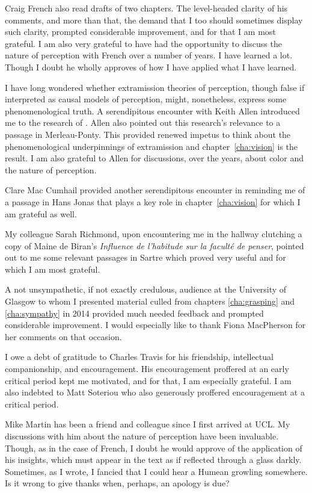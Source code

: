 Craig French also read drafts of two chapters. The level-headed clarity of his comments, and more than that, the demand that I too should sometimes display such clarity, prompted considerable improvement, and for that I am most grateful. I am also very grateful to have had the opportunity to discuss the nature of perception with French over a number of years. I have learned a lot. Though I doubt he wholly approves of how I have applied what I have learned.

I have long wondered whether extramission theories of perception, though false if interpreted as causal models of perception, might, nonetheless, express some phenomenological truth. A serendipitous encounter with Keith Allen introduced me to the research of \citet{Winer:1996as}. Allen also pointed out this research's relevance to a passage in Merleau-Ponty. This provided renewed impetus to think about the phenomenological underpinnings of extramission and chapter~\ref{cha:vision} is the result. I am also grateful to Allen for discussions, over the years, about color and the nature of perception.

Clare Mac Cumhail provided another serendipitous encounter in reminding me of a passage in Hans Jonas that plays a key role in chapter~\ref{cha:vision} for which I am grateful as well.

My colleague Sarah Richmond, upon encountering me in the hallway clutching a copy of Maine de Biran's \emph{Influence de l'habitude sur la facult\'{e} de penser}, pointed out to me some relevant passages in Sartre which proved very useful and for which I am most grateful.

A not unsympathetic, if not exactly credulous, audience at the University of Glasgow to whom I presented material culled from chapters \ref{cha:grasping} and \ref{cha:sympathy} in 2014 provided much needed feedback and prompted considerable improvement. I would especially like to thank Fiona MacPherson for her comments on that occasion.

I owe a debt of gratitude to Charles Travis for his friendship, intellectual companionship, and encouragement. His encouragement proffered at an early critical period kept me motivated, and for that, I am especially grateful. I am also indebted to Matt Soteriou who also generously proffered encouragement at a critical period.

Mike Martin has been a friend and colleague since I first arrived at UCL. My discussions with him about the nature of perception have been invaluable. Though, as in the case of French, I doubt he would approve of the application of his insights, which must appear in the text as if reflected through a glass darkly. Sometimes, as I wrote, I fancied that I could hear a Humean growling somewhere. Is it wrong to give thanks when, perhaps, an apology is due?


